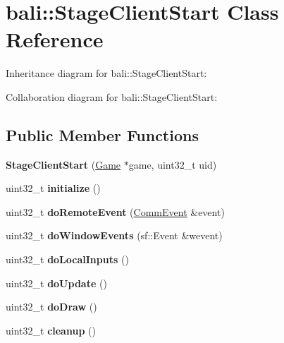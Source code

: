 \hypertarget{classbali_1_1_stage_client_start}{\section{bali\-:\-:Stage\-Client\-Start Class Reference}
\label{classbali_1_1_stage_client_start}
}


Inheritance diagram for bali\-:\-:Stage\-Client\-Start\-:


Collaboration diagram for bali\-:\-:Stage\-Client\-Start\-:
\subsection*{Public Member Functions}
\begin{DoxyCompactItemize}
\item 
\hypertarget{classbali_1_1_stage_client_start_acfe52d63d39f3cf15d3e0d91792265cf}{{\bfseries Stage\-Client\-Start} (\hyperlink{classbali_1_1_game}{Game} $\ast$game, uint32\-\_\-t uid)}\label{classbali_1_1_stage_client_start_acfe52d63d39f3cf15d3e0d91792265cf}

\item 
\hypertarget{classbali_1_1_stage_client_start_ada009972ff40d950ce6f8c4fc2113dce}{uint32\-\_\-t {\bfseries initialize} ()}\label{classbali_1_1_stage_client_start_ada009972ff40d950ce6f8c4fc2113dce}

\item 
\hypertarget{classbali_1_1_stage_client_start_aae7738cd09907eda03fdc2d302aa73ef}{uint32\-\_\-t {\bfseries do\-Remote\-Event} (\hyperlink{classbali_1_1_comm_event}{Comm\-Event} \&event)}\label{classbali_1_1_stage_client_start_aae7738cd09907eda03fdc2d302aa73ef}

\item 
\hypertarget{classbali_1_1_stage_client_start_ad2ca6f78be19109998f18e602dcf8087}{uint32\-\_\-t {\bfseries do\-Window\-Events} (sf\-::\-Event \&wevent)}\label{classbali_1_1_stage_client_start_ad2ca6f78be19109998f18e602dcf8087}

\item 
\hypertarget{classbali_1_1_stage_client_start_ae37cbe671b3951ccf384837611755123}{uint32\-\_\-t {\bfseries do\-Local\-Inputs} ()}\label{classbali_1_1_stage_client_start_ae37cbe671b3951ccf384837611755123}

\item 
\hypertarget{classbali_1_1_stage_client_start_a7414cdea61bac639bde6d1775316f8af}{uint32\-\_\-t {\bfseries do\-Update} ()}\label{classbali_1_1_stage_client_start_a7414cdea61bac639bde6d1775316f8af}

\item 
\hypertarget{classbali_1_1_stage_client_start_abc2f5518404180b26101a079f9097458}{uint32\-\_\-t {\bfseries do\-Draw} ()}\label{classbali_1_1_stage_client_start_abc2f5518404180b26101a079f9097458}

\item 
\hypertarget{classbali_1_1_stage_client_start_a7c86691cdb80fa2452e3cb119856cd96}{uint32\-\_\-t {\bfseries cleanup} ()}\label{classbali_1_1_stage_client_start_a7c86691cdb80fa2452e3cb119856cd96}

\end{DoxyCompactItemize}

